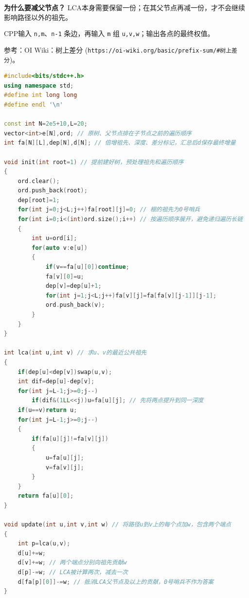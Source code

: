 \documentclass[10pt,landscape,a4paper]{article}
\begin{document}
\begin{multicols*}{3}
\textbf{为什么要减父节点？} LCA本身需要保留一份；在其父节点再减一份，才不会继续影响路径以外的祖先。\par
CPP输入 \texttt{n\allowbreak{},\allowbreak{}m}、\texttt{n\allowbreak{}-\allowbreak{}1} 条边，再输入 \texttt{m} 组 \texttt{u\allowbreak{},\allowbreak{}v\allowbreak{},\allowbreak{}w}；输出各点的最终权值。\par
参考：OI Wiki：树上差分 (\texttt{h\allowbreak{}t\allowbreak{}t\allowbreak{}p\allowbreak{}s\allowbreak{}:\allowbreak{}/\allowbreak{}/\allowbreak{}o\allowbreak{}i\allowbreak{}-\allowbreak{}w\allowbreak{}i\allowbreak{}k\allowbreak{}i\allowbreak{}.\allowbreak{}o\allowbreak{}r\allowbreak{}g\allowbreak{}/\allowbreak{}b\allowbreak{}a\allowbreak{}s\allowbreak{}i\allowbreak{}c\allowbreak{}/\allowbreak{}p\allowbreak{}r\allowbreak{}e\allowbreak{}f\allowbreak{}i\allowbreak{}x\allowbreak{}-\allowbreak{}s\allowbreak{}u\allowbreak{}m\allowbreak{}/\allowbreak{}\#\allowbreak{}树\allowbreak{}上\allowbreak{}差\allowbreak{}分})。\par
\par{}\par
\begin{lstlisting}[language=C++]
#include<bits/stdc++.h>
using namespace std;
#define int long long
#define endl '\n'

const int N=2e5+10,L=20;
vector<int>e[N],ord; // 原树、父节点排在子节点之前的遍历顺序
int fa[N][L],dep[N],d[N]; // 倍增祖先、深度、差分标记，汇总后d保存最终增量

void init(int root=1) // 提前建好树，预处理祖先和遍历顺序
{
    ord.clear();
    ord.push_back(root);
    dep[root]=1;
    for(int j=0;j<L;j++)fa[root][j]=0; // 根的祖先为0号哨兵
    for(int i=0;i<(int)ord.size();i++) // 按遍历顺序展开，避免递归遍历长链
    {
        int u=ord[i];
        for(auto v:e[u])
        {
            if(v==fa[u][0])continue;
            fa[v][0]=u;
            dep[v]=dep[u]+1;
            for(int j=1;j<L;j++)fa[v][j]=fa[fa[v][j-1]][j-1];
            ord.push_back(v);
        }
    }
}

int lca(int u,int v) // 求u、v的最近公共祖先
{
    if(dep[u]<dep[v])swap(u,v);
    int dif=dep[u]-dep[v];
    for(int j=L-1;j>=0;j--)
        if(dif&(1LL<<j))u=fa[u][j]; // 先将两点提升到同一深度
    if(u==v)return u;
    for(int j=L-1;j>=0;j--)
    {
        if(fa[u][j]!=fa[v][j])
        {
            u=fa[u][j];
            v=fa[v][j];
        }
    }
    return fa[u][0];
}

void update(int u,int v,int w) // 将路径u到v上的每个点加w，包含两个端点
{
    int p=lca(u,v);
    d[u]+=w;
    d[v]+=w; // 两个端点分别向祖先贡献w
    d[p]-=w; // LCA被计算两次，减去一次
    d[fa[p][0]]-=w; // 抵消LCA父节点及以上的贡献，0号哨兵不作为答案
}


\end{lstlisting}
\end{multicols*}
\end{document}

